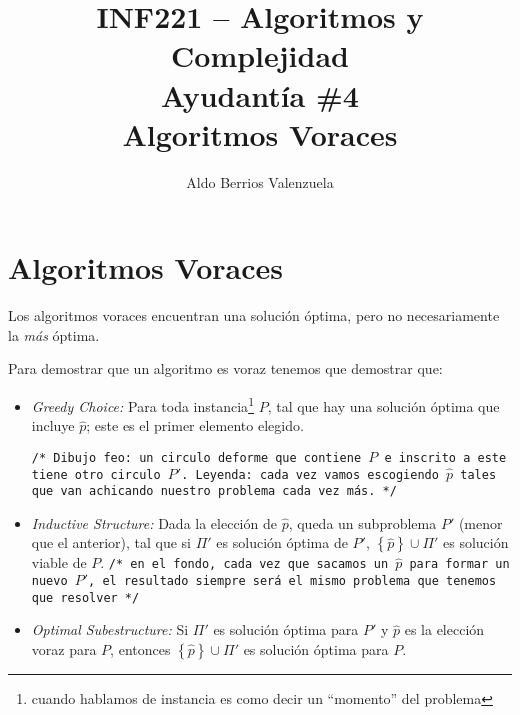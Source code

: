 \documentclass[english, spanish, fleqn, 10pt]{article}
\author{Aldo Berrios Valenzuela}
\title{INF221 -- Algoritmos y Complejidad\\[.4\baselineskip]Ayudantía \#4\\Algoritmos Voraces}
\newcommand{\comillas}[1]{``#1''}
\newcommand{\comentarioc}[1]{\texttt{\textcolor{webred}{/* #1 */}}}
\numberwithin{equation}{section}
\newcommand{\llaves}[1]{\left \{ #1 \right \}}
\theoremstyle{definition}
\begin{document}
\maketitle
\section{Algoritmos Voraces}
Los algoritmos voraces encuentran una solución óptima, pero no necesariamente la \emph{más} óptima.

Para demostrar que un algoritmo es voraz tenemos que demostrar que:
\begin{itemize}
	\item \emph{Greedy Choice:} Para toda instancia\footnote{cuando hablamos de instancia es como decir un \comillas{momento} del problema} $P$, tal que hay una solución óptima que incluye $\hat p$; este es el primer elemento elegido.
	\begin{center}
		\comentarioc{Dibujo feo: un circulo deforme que contiene $P$ e inscrito a este tiene otro circulo $P'$. Leyenda: cada vez vamos escogiendo $\hat{p}$ tales que van achicando nuestro problema cada vez más.}
	\end{center}

	\item \emph{Inductive Structure:} Dada la elección de $\hat p$, queda un subproblema $P'$ (menor que el anterior), tal que si $\Pi'$ es solución óptima de $P'$, $\llaves{\hat p}\cup \Pi'$ es solución viable de $P$. \comentarioc{en el fondo, cada vez que sacamos un $\hat p$ para formar un nuevo $P'$, el resultado siempre será el mismo problema que tenemos que resolver}

	\item \emph{Optimal Subestructure:} Si $\Pi'$ es solución óptima para $P'$ y $\hat p$ es la elección voraz para $P$, entonces $\llaves{\hat p}\cup \Pi'$ es solución óptima para $P$.
\end{itemize}
\end{document}
